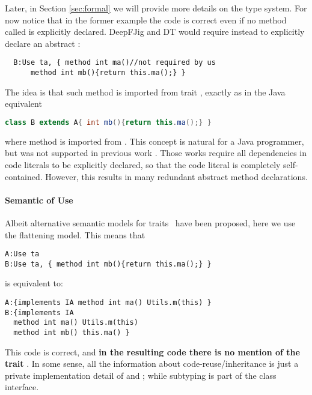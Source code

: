 Later, in Section \ref{sec:formal} we will provide more details on the type
system. 
For now notice that in the former example the code is correct even if
no method called \Q@ma@ is explicitly declared.
DeepFJig and DT would require instead to explicitly declare an abstract \Q@ma@:
\saveSpace
\begin{lstlisting}
  B:Use ta, { method int ma()//not required by us
      method int mb(){return this.ma();} }
\end{lstlisting}\saveSpace
\noindent
The idea is that such method is imported from trait \Q@ta@, exactly as in the Java equivalent
\saveSpace\begin{lstlisting}[language=Java]
  class B extends A{ int mb(){return this.ma();} }  
\end{lstlisting}
\saveSpace
where method \Q@ma@ is imported from \Q@A@.
This concept is natural for a Java programmer, but was not supported
in previous work \cite{BETTINI2013521,deep}. Those works require all
dependencies in code literals to be explicitly declared, so that the
code literal is completely self-contained. However, this results in
many redundant abstract method declarations.

\paragraph{Semantic of Use}
Albeit alternative semantic models for traits~\cite{Traits:ECOOP2003} have been proposed,
here we use the flattening model. This means that 
\saveSpace\begin{lstlisting}
A:Use ta
B:Use ta, { method int mb(){return this.ma();} }
\end{lstlisting}\saveSpace
 
\noindent is equivalent to:
  
\saveSpace \begin{lstlisting}
A:{implements IA method int ma() Utils.m(this) }
B:{implements IA
  method int ma() Utils.m(this)
  method int mb() this.ma() } 
 \end{lstlisting}
\saveSpace 
 This code is correct, and {\bf in the resulting code there is no mention of the trait
 \Q@ta@}. In some sense, all the information about code-reuse/inheritance
  is just a private implementation detail of \Q@A@
 and \Q@B@; while subtyping is part of the class interface.






